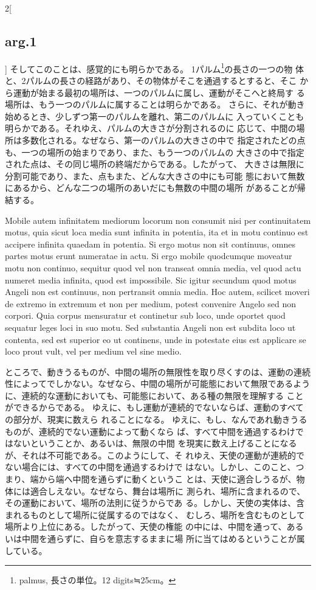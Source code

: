 \documentclass[paper=a4paper,fontsize=10pt,jafontsize=9pt,titlepage]{jlreq}
\begin{document}
\begin{paracol}{2}[\subsection{arg.1}]
そしてこのことは、感覚的にも明らかである。
1パルム\footnote{palmus, 長さの単位。12 digits≒25cm。}の長さの一つの物
 体と、2パルムの長さの経路があり、その物体がそこを通過するとすると、そこ
 から運動が始まる最初の場所は、一つのパルムに属し、運動がそこへと終局す
 る場所は、もう一つのパルムに属することは明らかである。
さらに、それが動き始めるとき、少しずつ第一のパルムを離れ、第二のパルムに
 入っていくことも明らかである。それゆえ、パルムの大きさが分割されるのに
 応じて、中間の場所は多数化される。なぜなら、第一のパルムの大きさの中で
 指定されたどの点も、一つの場所の始まりであり、また、もう一つのパルムの
 大きさの中で指定された点は、その同じ場所の終端だからである。したがって、
 大きさは無限に分割可能であり、また、点もまた、どんな大きさの中にも可能
 態において無数にあるから、どんな二つの場所のあいだにも無数の中間の場所
 があることが帰結する。

\switchcolumn*

Mobile autem infinitatem mediorum locorum non consumit nisi per
continuitatem motus, quia sicut loca media sunt infinita in potentia,
ita et in motu continuo est accipere infinita quaedam in potentia. Si
ergo motus non sit continuus, omnes partes motus erunt numeratae in
actu. Si ergo mobile quodcumque moveatur motu non continuo, sequitur
quod vel non transeat omnia media, vel quod actu numeret media infinita,
quod est impossibile. Sic igitur secundum quod motus Angeli non est
continuus, non pertransit omnia media. Hoc autem, scilicet moveri de
extremo in extremum et non per medium, potest convenire Angelo sed non
corpori. Quia corpus mensuratur et continetur sub loco, unde oportet
quod sequatur leges loci in suo motu. Sed substantia Angeli non est
subdita loco ut contenta, sed est superior eo ut continens, unde in
potestate eius est applicare se loco prout vult, vel per medium vel sine
medio.

\switchcolumn

ところで、動きうるものが、中間の場所の無限性を取り尽くすのは、運動の連続
性によってでしかない。なぜなら、中間の場所が可能態において無限であるよう
 に、連続的な運動においても、可能態において、ある種の無限を理解する
 ことができるからである。
ゆえに、もし運動が連続的でないならば、運動のすべての部分が、現実に数えら
 れることになる。
ゆえに、もし、なんであれ動きうるものが、連続的でない運動によって動くなら
 ば、すべて中間を通過するわけではないということか、あるいは、無限の中間
 を現実に数え上げることになるが、それは不可能である。このようにして、そ
 れゆえ、天使の運動が連続的でない場合には、すべての中間を通過するわけで
 はない。しかし、このこと、つまり、端から端へ中間を通らずに動くというこ
 とは、天使に適合しうるが、物体には適合しえない。なぜなら、舞台は場所に
 測られ、場所に含まれるので、その運動において、場所の法則に従うからであ
 る。しかし、天使の実体は、含まれるものとして場所に従属するのではなく、
 むしろ、場所を含むものとして場所より上位にある。したがって、天使の権能
 の中には、中間を通って、あるいは中間を通らずに、自らを意志するままに場
 所に当てはめるということが属している。


\end{paracol}
\end{document}
